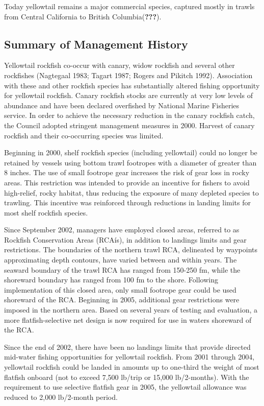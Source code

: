 \documentclass[12pt,]{article}
\begin{document}
Today yellowtail remains a major commercial species, captured mostly in
trawls from Central California to British Columbia({\textbf{???}}).

\subsection{Summary of Management
History}\label{summary-of-management-history}

Yellowtail rockfish co-occur with canary, widow rockfish and several
other rockfishes (Nagtegaal 1983; Tagart 1987; Rogers and Pikitch 1992).
Association with these and other rockfish species has substantially
altered fishing opportunity for yellowtail rockfish. Canary rockfish
stocks are currently at very low levels of abundance and have been
declared overfished by National Marine Fisheries service. In order to
achieve the necessary reduction in the canary rockfish catch, the
Council adopted stringent management measures in 2000. Harvest of canary
rockfish and their co-occurring species was limited.

Beginning in 2000, shelf rockfish species (including yellowtail) could
no longer be retained by vessels using bottom trawl footropes with a
diameter of greater than 8 inches. The use of small footrope gear
increases the risk of gear loss in rocky areas. This restriction was
intended to provide an incentive for fishers to avoid high-relief, rocky
habitat, thus reducing the exposure of many depleted species to
trawling. This incentive was reinforced through reductions in landing
limits for most shelf rockfish species.

Since September 2002, managers have employed closed areas, referred to
as Rockfish Conservation Areas (RCAís), in addition to landings limits
and gear restrictions. The boundaries of the northern trawl RCA,
delineated by waypoints approximating depth contours, have varied
between and within years. The seaward boundary of the trawl RCA has
ranged from 150-250 fm, while the shoreward boundary has ranged from 100
fm to the shore. Following implementation of this closed area, only
small footrope gear could be used shoreward of the RCA. Beginning in
2005, additional gear restrictions were imposed in the northern area.
Based on several years of testing and evaluation, a more
flatfish-selective net design is now required for use in waters
shoreward of the RCA.

Since the end of 2002, there have been no landings limits that provide
directed mid-water fishing opportunities for yellowtail rockfish. From
2001 through 2004, yellowtail rockfish could be landed in amounts up to
one-third the weight of most flatfish onboard (not to exceed 7,500
lb/trip or 15,000 lb/2-months). With the requirement to use selective
flatfish gear in 2005, the yellowtail allowance was reduced to 2,000
lb/2-month period.
\end{document}
